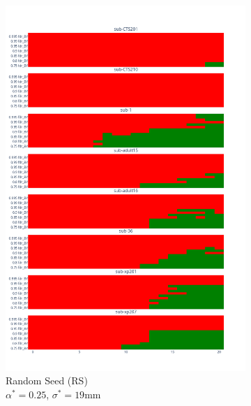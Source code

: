 \documentclass{article}
\begin{document}
\begin{figure}
\begin{subfigure}[t]{0.3\textwidth}
         \includegraphics[width=\textwidth]{figures/rs.png}
         \caption{\centering Random Seed (RS)\\ $\alpha^*=0.25$, $\sigma^*=19$mm}
         \label{fig:rs}
     \end{subfigure}
    \begin{subfigure}[t]{0.3\textwidth}
         \centering

\end{subfigure}
\end{figure}
\end{document}
